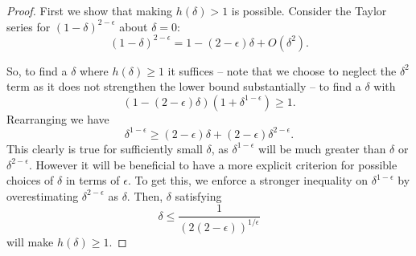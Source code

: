 \begin{proof}
  First we show that making $h(\delta) > 1$ is possible.
Consider the Taylor series for $(1-\delta)^{2-\epsilon}$ about $\delta = 0$:
$$(1-\delta)^{2-\epsilon} = 1 - (2-\epsilon)\delta + O(\delta^2).$$

So, to find a $\delta$ where $h(\delta) \ge 1$ it suffices -- note that we
choose to neglect the $\delta^2$ term as it does not strengthen the lower
bound substantially -- to find a $\delta$ with
$$(1-(2-\epsilon)\delta)(1+\delta^{1-\epsilon}) \ge 1.$$
Rearranging we have 
$$\delta^{1-\epsilon} \ge (2-\epsilon)\delta + (2-\epsilon)\delta^{2-\epsilon}.$$
This clearly is true for sufficiently small $\delta$, as
$\delta^{1-\epsilon}$ will be much greater than $\delta$ or
$\delta^{2-\epsilon}$.
However it will be beneficial to have a more explicit criterion for possible
choices of $\delta$ in terms of $\epsilon$. To get this, we enforce a 
stronger inequality on $\delta^{1-\epsilon}$ by overestimating
$\delta^{2-\epsilon}$ as $\delta$. 
Then, $\delta$ satisfying
\begin{equation}
  \label{eqn:deltaUpperIneq}
  \delta \le \frac{1}{(2(2-\epsilon))^{1/\epsilon}}
\end{equation}
will make $h(\delta) \ge 1.$


\end{proof}
